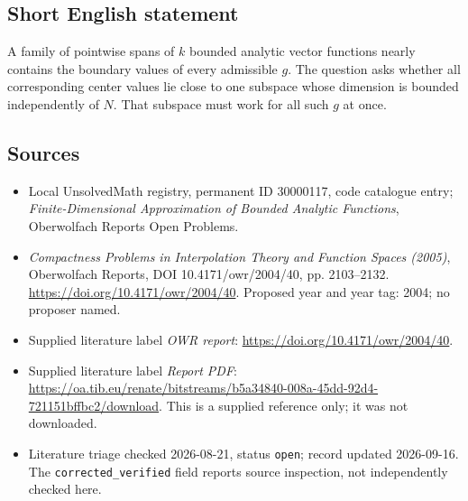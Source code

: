 \documentclass[11pt]{article}
\begin{document}
\subsection{Short English statement}
A family of pointwise spans of \(k\) bounded analytic vector functions nearly contains the boundary values of every admissible \(g\). The question asks whether all corresponding center values lie close to one subspace whose dimension is bounded independently of \(N\). That subspace must work for all such \(g\) at once.
\subsection{Sources}
\begin{itemize}\item Local UnsolvedMath registry, permanent ID 30000117, code catalogue entry; \emph{Finite-Dimensional Approximation of Bounded Analytic Functions}, Oberwolfach Reports Open Problems.\item \emph{Compactness Problems in Interpolation Theory and Function Spaces (2005)}, Oberwolfach Reports, DOI 10.4171/owr/2004/40, pp. 2103--2132. \url{https://doi.org/10.4171/owr/2004/40}. Proposed year and year tag: 2004; no proposer named.\item Supplied literature label \emph{OWR report}: \url{https://doi.org/10.4171/owr/2004/40}.\item Supplied literature label \emph{Report PDF}: \url{https://oa.tib.eu/renate/bitstreams/b5a34840-008a-45dd-92d4-721151bffbc2/download}. This is a supplied reference only; it was not downloaded.\item Literature triage checked 2026-08-21, status \texttt{open}; record updated 2026-09-16. The \texttt{corrected\_verified} field reports source inspection, not independently checked here.\end{itemize}
\end{document}
